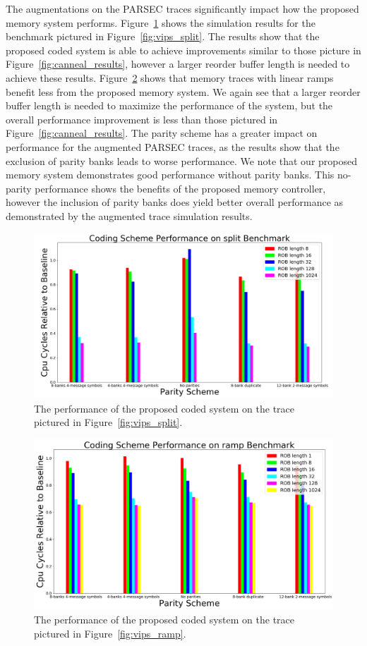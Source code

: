 The augmentations on the PARSEC traces significantly impact how the proposed memory system performs. Figure~\ref{fig:vips_split_results} shows the simulation results for the benchmark pictured in Figure~\ref{fig:vips_split}. The results show that the proposed coded system is able to achieve improvements similar to those picture in Figure~\ref{fig:canneal_results}, however a larger reorder buffer length is needed to achieve these results. Figure~\ref{fig:vips_ramp_results} shows that memory traces with linear ramps benefit less from the proposed memory system. We again see that a larger reorder buffer length is needed to maximize the performance of the system, but the overall performance improvement is less than those pictured in Figure~\ref{fig:canneal_results}. The parity scheme has a greater impact on performance for the augmented PARSEC traces, as the results show that the exclusion of parity banks leads to worse performance. We note that our proposed memory system demonstrates good performance without parity banks. This no-parity performance shows the benefits of the proposed memory controller, however the inclusion of parity banks does yield better overall performance as demonstrated by the augmented trace simulation results.

\begin{figure}[h!]
		\includegraphics[width=\linewidth]{figures/vips_split_results.png}
		\caption{The performance of the proposed coded system on the trace pictured in Figure~\ref{fig:vips_split}.}
		\label{fig:vips_split_results}
\end{figure}


\begin{figure}[h!]
		\includegraphics[width=\linewidth]{figures/vips_ramp_results.png}
		\caption{The performance of the proposed coded system on the trace pictured in Figure~\ref{fig:vips_ramp}.}
		\label{fig:vips_ramp_results}
\end{figure}